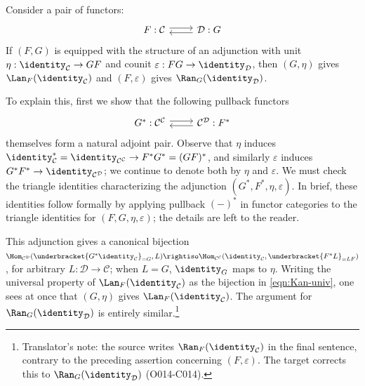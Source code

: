 \begin{example}
	Consider a pair of functors:
	\[\begin{tikzcd}
		F: \mathcal{C} \arrow[r, shift left] & \mathcal{D}: G \arrow[l, shift left]
	\end{tikzcd}\]
	If $(F, G)$ is equipped with the structure of an adjunction with unit
	$\eta: \identity_{\mathcal{C}} \to GF$ and counit
	$\varepsilon: FG \to \identity_{\mathcal{D}}$, then $(G, \eta)$ gives
	$\Lan_F (\identity_{\mathcal{C}})$ and $(F, \varepsilon)$ gives
	$\Ran_G (\identity_{\mathcal{D}})$.

	To explain this, first we show that the following pullback functors
	\[\begin{tikzcd}
		G^*: \mathcal{C}^{\mathcal{C}} \arrow[r, shift left] &
		\mathcal{C}^{\mathcal{D}}: F^* \arrow[l, shift left]
	\end{tikzcd}\]
	themselves form a natural adjoint pair. Observe that $\eta$
	induces
	$\identity_{\mathcal{C}}^* = \identity_{\mathcal{C}^{\mathcal{C}}}
	\to F^* G^* = (GF)^*$, and similarly $\varepsilon$ induces
	$G^* F^* \to \identity_{\mathcal{C}^{\mathcal{D}}}$; we continue to denote
	both by $\eta$ and $\varepsilon$. We must check the triangle identities
	characterizing the adjunction $(G^*, F^*, \eta, \varepsilon)$. In brief,
	these identities follow formally by applying pullback $(-)^*$ in functor
	categories to the triangle identities for $(F, G, \eta, \varepsilon)$;
	the details are left to the reader.

	This adjunction gives a canonical bijection
	$\Hom_{\mathcal{C}^{\mathcal{D}}}(\underbracket{G^* \identity_{\mathcal{C}}}_{= G}, L) \rightiso \Hom_{\mathcal{C}^{\mathcal{C}}}(\identity_{\mathcal{C}} , \underbracket{F^* L}_{=LF})$,
	for arbitrary $L: \mathcal{D} \to \mathcal{C}$; when $L = G$,
	$\identity_G$ maps to $\eta$. Writing the universal property of
	$\Lan_F (\identity_{\mathcal{C}})$ as the bijection in
	\eqref{eqn:Kan-univ}, one sees at once that $(G, \eta)$ gives
	$\Lan_F (\identity_{\mathcal{C}})$. The argument for
	$\Ran_G (\identity_{\mathcal{D}})$ is entirely similar.\footnote{Translator's
	note: the source writes $\Ran_F(\identity_{\mathcal{C}})$ in the final
	sentence, contrary to the preceding assertion concerning
	$(F,\varepsilon)$. The target corrects this to
	$\Ran_G(\identity_{\mathcal{D}})$ (O014-C014).}
\end{example}

